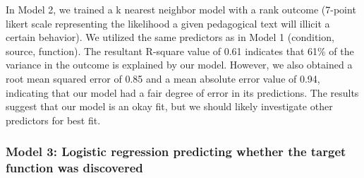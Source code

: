 \documentclass[
  english,
  man]{apa6}
\begin{document}
In Model 2, we trained a k nearest neighbor model with a rank outcome (7-point
likert scale representing the likelihood a given pedagogical text will illicit a
certain behavior). We utilized the same predictors as in Model 1 (condition, source,
function). The resultant R-square value of 0.61 indicates that 61\% of the variance
in the outcome is explained by our model. However, we also obtained a root mean
squared error of 0.85 and a mean absolute error value of 0.94, indicating that our
model had a fair degree of error in its predictions. The results suggest that our
model is an okay fit, but we should likely investigate other predictors for best
fit.

\hypertarget{model-3-logistic-regression-predicting-whether-the-target-function-was-discovered}{%
\subsubsection{Model 3: Logistic regression predicting whether the target function was discovered}\label{model-3-logistic-regression-predicting-whether-the-target-function-was-discovered}}
\end{document}

